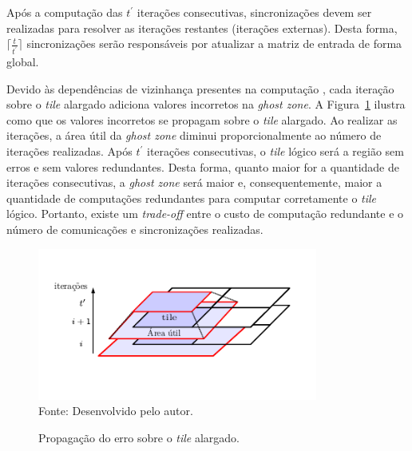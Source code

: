 Após a computação das $t^\prime$ iterações consecutivas,
sincronizações devem ser realizadas para resolver as iterações restantes
(iterações externas). Desta forma, $\lceil\frac{t}{t^\prime}\rceil$
sincronizações serão responsáveis por atualizar a matriz de entrada de forma
global.

Devido às dependências de vizinhança presentes na computação \stencil, cada
iteração sobre o \textit{tile} alargado adiciona valores incorretos na
\textit{ghost zone}. A Figura~\ref{fig:errorPropagation} ilustra como que os
valores incorretos se propagam sobre o \textit{tile} alargado. Ao realizar as
iterações, a área útil da \textit{ghost zone} diminui proporcionalmente ao
número de iterações realizadas. Após $t^\prime$ iterações consecutivas, o
\textit{tile} lógico será a região sem erros e sem valores redundantes. Desta
forma, quanto maior for a quantidade de iterações consecutivas, a \textit{ghost
    zone} será maior e, consequentemente, maior a quantidade de computações
redundantes para computar corretamente o \textit{tile} lógico. Portanto, existe
um \textit{trade-off} entre o custo de computação redundante e o número de
comunicações e sincronizações realizadas.


\begin{figure}[t]
  \begin{minipage}[b]{0.9\textwidth}
	\centering
    \caption{Propagação do erro sobre o \textit{tile} alargado.}
    \includegraphics[height=5cm]{figs/tilingProp.pdf} \\
    Fonte: Desenvolvido pelo autor.
    \label{fig:errorPropagation}
  \end{minipage}
\end{figure}


